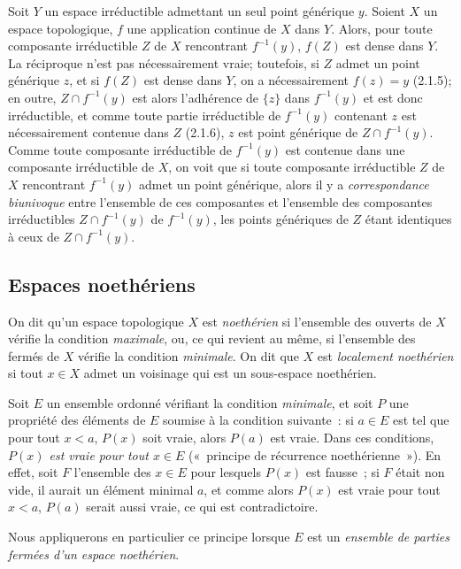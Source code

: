 \begin{env}[2.1.8]
\label{0.2.1.8-fr}
Soit $Y$ un espace irréductible admettant un seul point générique $y$. Soient
$X$ un espace topologique, $f$ une application continue de $X$ dans $Y$.
Alors, pour toute composante irréductible $Z$ de $X$ rencontrant $f^{-1}(y)$,
$f(Z)$ est dense dans $Y$. La réciproque n'est pas nécessairement vraie;
toutefois, si $Z$ admet un point générique $z$, et si $f(Z)$ est dense dans
$Y$, on a nécessairement $f(z)=y$ (2.1.5); en outre, $Z\cap f^{-1}(y)$ est
alors l'adhérence de $\{z\}$ dans $f^{-1}(y)$ et est donc irréductible, et
comme toute partie irréductible de $f^{-1}(y)$ contenant $z$ est
nécessairement contenue dans $Z$ (2.1.6), $z$ est point générique de
$Z\cap f^{-1}(y)$. Comme toute composante irréductible de $f^{-1}(y)$ est
contenue dans une composante irréductible de $X$, on voit que si toute
composante irréductible $Z$ de $X$ rencontrant $f^{-1}(y)$ admet un point
générique, alors il y a \emph{correspondance biunivoque} entre l'ensemble de
ces composantes et l'ensemble des composantes irréductibles
$Z\cap f^{-1}(y)$ de $f^{-1}(y)$, les points génériques de $Z$ étant
identiques à ceux de $Z\cap f^{-1}(y)$.
\end{env}


\subsection{Espaces noethériens}
\label{subsection:0.2.2-fr}

\begin{env}[2.2.1]
\label{0.2.2.1-fr}
On dit qu'un espace topologique $X$ est \emph{noethérien} si l'ensemble des
ouverts de $X$ vérifie la condition \emph{maximale}, ou, ce qui revient au
même, si l'ensemble des fermés de $X$ vérifie la condition \emph{minimale}. On
dit que $X$ est \emph{localement noethérien} si tout $x\in X$ admet un
voisinage qui est un sous-espace noethérien.
\end{env}

\begin{env}[2.2.2]
\label{0.2.2.2-fr}
Soit $E$ un ensemble ordonné vérifiant la condition \emph{minimale}, et soit
$P$ une propriété des éléments de $E$ soumise à la condition suivante~: si
$a\in E$ est tel que pour tout $x<a$, $P(x)$ soit vraie, alors $P(a)$ est
vraie. Dans ces conditions, \emph{$P(x)$ est vraie pour tout $x\in E$}
(«~principe de récurrence noethérienne~»). En effet, soit $F$ l'ensemble des
$x\in E$ pour lesquels $P(x)$ est fausse~; si $F$ était non vide, il aurait un
élément minimal $a$, et comme alors $P(x)$ est vraie pour tout $x<a$, $P(a)$
serait aussi vraie, ce qui est contradictoire.

Nous appliquerons en particulier ce principe lorsque $E$ est un \emph{ensemble
de parties fermées d'un espace noethérien}.
\end{env}

